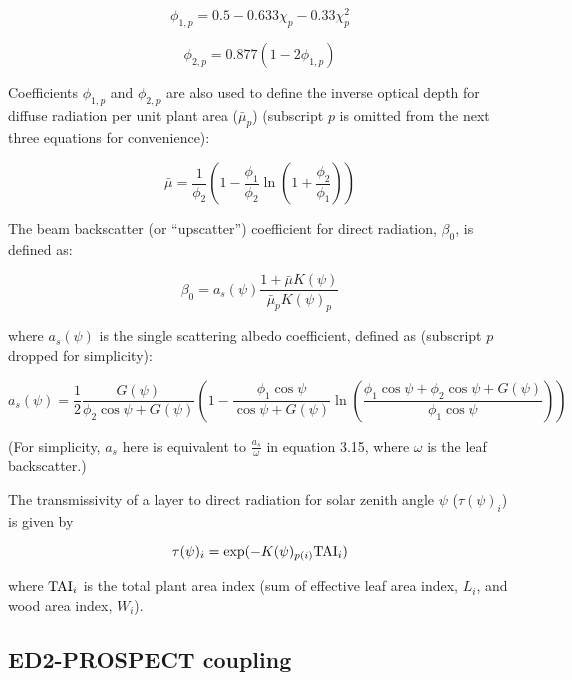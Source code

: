 \begin{equation}
  \phi_{1,p} = 0.5 - 0.633 \chi_{p} - 0.33 \chi_{p}^2
\end{equation}

\begin{equation}
  \phi_{2,p} = 0.877 (1 - 2 \phi_{1,p})
\end{equation}

Coefficients $\phi_{1,p}$ and $\phi_{2,p}$ are also used to define the inverse optical depth for diffuse radiation per unit plant area ($\bar\mu_{p}$) (subscript $p$ is omitted from the next three equations for convenience):

\begin{equation}
  \bar\mu = \frac{1}{\phi_{2}}\left( 1 - \frac{\phi_{1}}{\phi_{2}} \ln\left( 1 + \frac{\phi_{2}}{\phi_{1}}\right) \right)
\end{equation}

The beam backscatter (or ``upscatter'') coefficient for direct radiation, $\beta_0$, is defined as:

\begin{equation}
  \beta_{0} = a_s(\psi) \frac{1 + \bar\mu K(\psi)}{\bar\mu_{p} K(\psi)_{p}}
\end{equation}

where $a_s(\psi)$ is the single scattering albedo coefficient, defined as (subscript $p$ dropped for simplicity):

\begin{equation}
  a_s(\psi) = \frac{1}{2}
  \frac{G(\psi)}{\phi_2 \cos\psi + G(\psi)}
  \left(
    1 -
    \frac{\phi_1 \cos\psi}{\cos\psi + G(\psi)}
    \ln\left(
      \frac{\phi_1 \cos\psi + \phi_2 \cos\psi + G(\psi)}{\phi_1 \cos\psi}
    \right)
  \right)
\end{equation}

(For simplicity, $a_s$ here is equivalent to $\frac{a_s}{\omega}$ in \citet{clm45_note} equation 3.15, where $\omega$ is the leaf backscatter.)

The transmissivity of a layer to direct radiation for solar zenith angle $\psi$ ($\tau(\psi)_i$) is given by

\begin{equation}
  \tau(\psi)_i = \exp(-K(\psi)_{p(i)} \mathrm{TAI}_i)
\end{equation}

where $\mathrm{TAI}_{i}$ is the total plant area index (sum of effective leaf area index, $L_{i}$, and wood area index, $W_{i}$).

\subsection{ED2-PROSPECT coupling}

